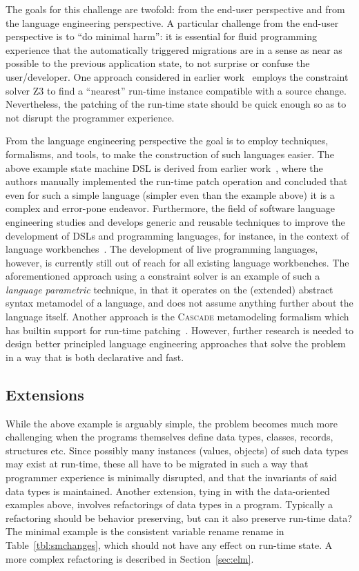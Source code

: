 \documentclass[english,submission]{programming}
\begin{document}
The goals for this challenge are twofold: from the end-user perspective and from the language engineering perspective. A particular challenge from the end-user perspective is to ``do minimal harm'': it is essential for fluid programming experience that the automatically triggered migrations are in a sense as near as possible to the previous application state, to not surprise or confuse the user/developer.
One approach  considered in earlier work~\cite{RuntimeConstraint} employs the constraint solver Z3 to find a ``nearest'' run-time instance compatible with a source change. Nevertheless, the patching of the run-time state should be quick enough so as to not disrupt the programmer experience.

From the language engineering perspective the goal is to employ techniques, formalisms, and tools, to make the construction of such languages easier. The above example state machine DSL is derived from earlier work~\cite{vanRozen19}, where the authors manually implemented the run-time patch operation and concluded that even for such a simple language (simpler even than the example above) it is a complex and error-pone endeavor. Furthermore, the field of software language engineering studies and develops generic and reusable techniques to improve the development of DSLs and programming languages, for instance, in the context of language workbenches~\cite{ERDWEG201524}. The development of live programming languages, however, is currently still out of reach for all existing language workbenches. The aforementioned approach using a constraint solver is an example of such a \textit{language parametric} technique, in that it operates on the (extended) abstract syntax metamodel of a language, and does not assume anything further about the language itself. Another approach is the \textsc{Cascade} metamodeling formalism which has builtin support for run-time patching~\cite{Cascade}. However, further research is needed to design better principled language engineering approaches that solve the problem in a way that is both declarative and fast.

\subsection{Extensions}

While the above example is arguably simple, the problem becomes much more challenging when the programs themselves define data types, classes, records, structures etc. Since possibly many instances (values, objects) of such data types may exist at run-time, these all have to be migrated in such a way that programmer experience is minimally disrupted, and that the invariants of said data types is maintained.
Another extension, tying in with the data-oriented examples above, involves refactorings of data types in a program. Typically a refactoring should be behavior preserving, but can it also preserve run-time data? The minimal example is the consistent variable rename rename in Table~\ref{tbl:smchanges}, which should not have any effect on run-time state.  A more complex refactoring is described in Section~\ref{sec:elm}.
\end{document}
